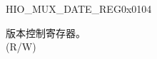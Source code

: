 \begin{register}{H}{IO\_MUX\_DATE\_REG}{0x0104}\label{regdesc:IOMUXDATEREG}
%
%
\regnewline%
\begin{regdesc}\begin{reglist}
\label{fielddesc:IOMUXDATE}\item [IO\_MUX\_DATE] 版本控制寄存器。\\
(R/W)
\end{reglist}\end{regdesc}
\end{register}


